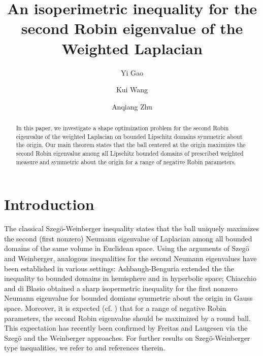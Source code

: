 \documentclass[11pt,leqno]{amsart}
\numberwithin{equation}{section}
\begin{document}
\title[Robin eigenvaule of the Weighted Laplacian]{An isoperimetric inequality  for the second Robin eigenvalue of the Weighted Laplacian}

\author{Yi Gao} 
\address{School of Mathematical Sciences, Soochow University, Suzhou, 215006, China}


\author{Kui Wang} 
\address{School of Mathematical Sciences, Soochow University, Suzhou, 215006, China}

\author{Anqiang Zhu} 
\address{School of Mathematics and Statistics, Wuhan University, Wuhan 430072, China}





\begin{abstract}
In this paper, we investigate a shape optimization problem for the  second Robin eigenvalue of the weighted Laplacian on bounded Lipschitz domains symmetric about the origin. Our main theorem states that the ball centered at the origin maximizes the second Robin eigenvalue among all Lipschitz bounded domains of prescribed weighted measure and symmetric about the origin for a range of negative Robin parameters.  








\end{abstract}
\maketitle

\section{Introduction}
The classical Szeg\"o-Weinberger inequality \cite{Sz54, Wei56} states that the ball uniquely maximizes the second (first nonzero) Neumann eigenvalue of Laplacian  among all bounded domains of the same volume in Euclidean space.   Using the arguments of  Szeg\"o and Weinberger, analogous inequalities for the second Neumann eigenvalues have been established in various settings:  Ashbaugh-Benguria \cite{AB95} extended the  the inequality to bounded domains in hemisphere and in hyperbolic space; Chiacchio and di Blasio \cite{CB12} obtained a sharp isopermetric inequality for the first nonzero Neumann eigenvalue for bounded domians symmetric about the origin in Gauss space. 
Moreover, it is expected (cf. \cite[Problem 4.41]{Hen17}) that for a range of negative Robin parameters, the second Robin eigenvalue should be maximized by  a round ball. This expectation has recently been confirmed by Freitas and Laugesen via the Szeg\"o \cite{FL20} and the Weinberger  \cite{FL21} approaches. 
For further results on Szeg\"o-Weinberger type inequalities, we refer to \cite{AS96,  As99, BBC20, BCB16,  LL23, LWW22, LWW23, MW24, Wang19, XW23} and references therein.
\end{document}
